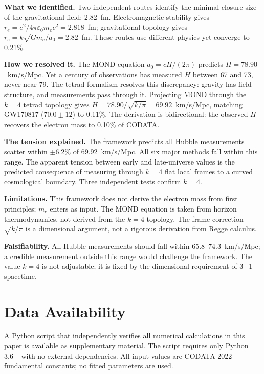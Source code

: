 \documentclass[aps,prd,preprint,superscriptaddress,showpacs,preprintnumbers,amsmath,amssymb,nofootinbib]{revtex4-2}
\begin{document}
\textbf{What we identified.} Two independent routes identify the minimal closure size of the gravitational field: 2.82~fm. Electromagnetic stability gives $r_e = e^2/4\pi\varepsilon_0 m_e c^2 = 2.818$~fm; gravitational topology gives $r_e = k\sqrt{Gm_e/a_0} = 2.82$~fm. These routes use different physics yet converge to 0.21\%.

\textbf{How we resolved it.} The MOND equation $a_0 = cH/(2\pi)$ predicts $H = 78.90$~km/s/Mpc. Yet a century of observations has measured $H$ between 67 and 73, never near 79. The tetrad formalism resolves this discrepancy: gravity has field structure, and measurements pass through it. Projecting MOND through the $k=4$ tetrad topology gives $H = 78.90/\sqrt{k/\pi} = 69.92$~km/s/Mpc, matching GW170817 ($70.0 \pm 12$) to 0.11\%. The derivation is bidirectional: the observed $H$ recovers the electron mass to 0.10\% of CODATA.

\textbf{The tension explained.} The framework predicts all Hubble measurements scatter within $\pm 6.2\%$ of 69.92~km/s/Mpc. All six major methods fall within this range. The apparent tension between early and late-universe values is the predicted consequence of measuring through $k=4$ flat local frames to a curved cosmological boundary. Three independent tests confirm $k=4$.

\textbf{Limitations.} This framework does not derive the electron mass from first principles; $m_e$ enters as input. The MOND equation is taken from horizon thermodynamics, not derived from the $k=4$ topology. The frame correction $\sqrt{k/\pi}$ is a dimensional argument, not a rigorous derivation from Regge calculus.

\textbf{Falsifiability.} All Hubble measurements should fall within 65.8--74.3~km/s/Mpc; a credible measurement outside this range would challenge the framework. The value $k=4$ is not adjustable; it is fixed by the dimensional requirement of 3+1 spacetime.

\section*{Data Availability}

A Python script that independently verifies all numerical calculations in this paper is available as supplementary material. The script requires only Python 3.6+ with no external dependencies. All input values are CODATA 2022 fundamental constants; no fitted parameters are used.
\end{document}
